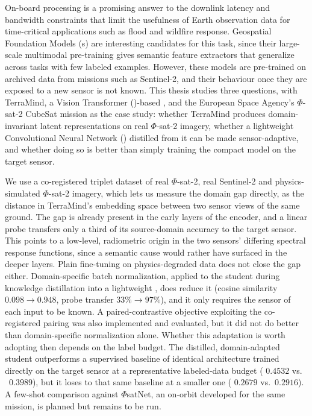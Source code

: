 On-board processing is a promising answer to the downlink latency and bandwidth constraints that limit the usefulness of Earth observation data for time-critical applications such as flood and wildfire response.
Geospatial Foundation Models (s) are interesting candidates for this task, since their large-scale multimodal pre-training gives semantic feature extractors that generalize across tasks with few labeled examples.
However, these models are pre-trained on archived data from missions such as Sentinel-2, and their behaviour once they are exposed to a new sensor is not known.
This thesis studies three questions, with TerraMind, a Vision Transformer ()-based , and the European Space Agency's $\Phi$-sat-2 CubeSat mission as the case study: whether TerraMind produces domain-invariant latent representations on real $\Phi$-sat-2 imagery, whether a lightweight Convolutional Neural Network () distilled from it can be made sensor-adaptive, and whether doing so is better than simply training the compact model on the target sensor.

We use a co-registered triplet dataset of real $\Phi$-sat-2, real Sentinel-2 and physics-simulated $\Phi$-sat-2 imagery, which lets us measure the domain gap directly, as the distance in TerraMind's embedding space between two sensor views of the same ground.
The gap is already present in the early layers of the encoder, and a linear probe transfers only a third of its source-domain accuracy to the target sensor.
This points to a low-level, radiometric origin in the two sensors' differing spectral response functions, since a semantic cause would rather have surfaced in the deeper layers.
Plain fine-tuning on physics-degraded data does not close the gap either.
Domain-specific batch normalization, applied to the student during knowledge distillation into a lightweight , does reduce it (cosine similarity $0.098 \rightarrow 0.948$, probe transfer $33\% \rightarrow 97\%$), and it only requires the sensor of each input to be known.
A paired-contrastive objective exploiting the co-registered pairing was also implemented and evaluated, but it did not do better than domain-specific normalization alone.
Whether this adaptation is worth adopting then depends on the label budget.
The distilled, domain-adapted student outperforms a supervised baseline of identical architecture trained directly on the target sensor at a representative labeled-data budget ( $0.4532$ vs.
\ $0.3989$), but it loses to that same baseline at a smaller one ( $0.2679$ vs.\ $0.2916$).
A few-shot comparison against $\Phi$satNet, an on-orbit  developed for the same mission, is planned but remains to be run.
